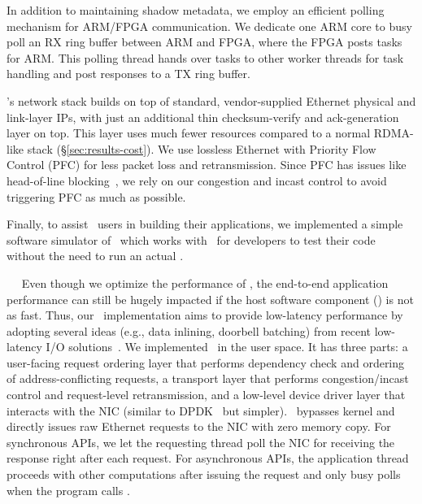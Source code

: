 In addition to maintaining shadow metadata, we employ an efficient polling mechanism for ARM/FPGA communication.
We dedicate one ARM core to busy poll an RX ring buffer between ARM and FPGA,
where the FPGA posts tasks for ARM.
This polling thread hands over tasks to other worker threads for task handling %
and post responses to a TX ring buffer.

\sysboard's network stack builds on top of standard, vendor-supplied Ethernet physical and link-layer IPs, with just an additional thin checksum-verify and ack-generation layer on top.
This layer uses much fewer resources compared to a normal RDMA-like stack (\S\ref{sec:results-cost}).
%
We use lossless Ethernet with Priority Flow Control (PFC) for less packet loss and retransmission. Since PFC has issues like head-of-line blocking~\cite{DCQCN-sigcomm15,hpcc-sigcomm19,alibaba-rdma-nsdi21,IRN}, we rely on our congestion and incast control to avoid triggering PFC as much as possible.

Finally, to assist \sys\ users in building their applications, we implemented a simple software simulator
of \sysboard\ which works with \syslib\ for developers to test their code without the need to run an actual \sysboard.

~~
Even though we optimize the performance of \sysboard, the end-to-end application performance can still be hugely impacted if the host software component (\syslib) is not as fast.
Thus, our \syslib\ implementation aims to provide low-latency performance by adopting several ideas (e.g., data inlining, doorbell batching) from recent low-latency I/O solutions~\cite{ERPC,Kalia14-RDMAKV,Kalia16-ATC,Tsai17-SOSP,Shinjuku,Shenango,demikernel-sosp21}.
We implemented \syslib\ in the user space. 
It has three parts: a user-facing request ordering layer that performs dependency check and ordering of address-conflicting requests,
a transport layer that performs congestion/incast control and request-level retransmission, 
and a low-level device driver layer that interacts with the NIC (similar to DPDK~\cite{DPDK} but simpler).
\syslib\ bypasses kernel and directly issues raw Ethernet requests to the NIC with zero memory copy.
For synchronous APIs, we let the requesting thread poll the NIC for receiving the response right after each request.
For asynchronous APIs, the application thread proceeds with other computations after issuing the request and only busy polls when the program calls \poll.

